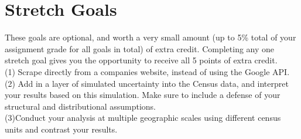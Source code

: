 \documentclass[a4paper, 11pt]{article}
\begin{document}
\section{Stretch Goals}
These goals are optional, and worth a very small amount (up to 5\% total of your assignment grade for all goals in total) of extra credit.  Completing any one stretch goal gives you the opportunity to receive all 5 points of extra credit.\\
(1) Scrape directly from a companies website, instead of using the Google API.\\
(2) Add in a layer of simulated uncertainty into the Census data, and interpret your results based on this simulation.  Make sure to include a defense of your structural and distributional assumptions.\\
(3)Conduct your analysis at multiple geographic scales using different census units and contrast your results.
\end{document}
